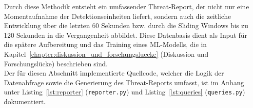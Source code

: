     Durch diese Methodik entsteht ein umfassender Threat-Report, der nicht nur eine Momentaufnahme der Detektionseinheiten liefert, sondern auch die zeitliche Entwicklung über die letzten 60 Sekunden bzw. durch die Sliding Windows bis zu 120 Sekunden in die Vergangenheit abbildet. Diese Datenbasis dient als Input für die spätere Aufbereitung und das Training eines ML-Modells, die in Kapitel~\ref{chapter:diskussion_und_forschungsluecke} (Diskussion und Forschungslücke) beschrieben sind.\\
    Der für diesen Abschnitt implementierte Quellcode, welcher die Logik der Datenabfrage sowie die Generierung des Threat-Reports umfasst, ist im Anhang unter Listing~\ref{lst:reporter} (\texttt{reporter.py}) und Listing~\ref{lst:queries} (\texttt{queries.py}) dokumentiert.